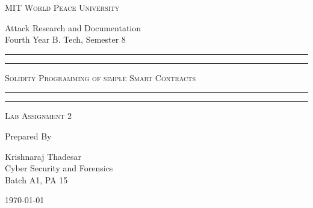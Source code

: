 \documentclass[11pt]{article}
\begin{document}
\begin{titlepage}
	\centering


	\huge\textsc{
		MIT World Peace University
	}\\

	\vspace{0.75\baselineskip} %

	\LARGE{
		Attack Research and Documentation\\
		Fourth Year B. Tech, Semester 8
	}

	\vfill %


	\rule{\textwidth}{1.6pt}\vspace*{-\baselineskip}\vspace*{2pt}
	\rule{\textwidth}{0.6pt}
	\vspace{0.75\baselineskip} %

	\huge{\textsc{
        Solidity Programming of simple Smart Contracts
    }} \\

	\vspace{0.5\baselineskip} %
	\rule{\textwidth}{0.6pt}\vspace*{-\baselineskip}\vspace*{2.8pt}
	\rule{\textwidth}{1.6pt}

	\vspace{1\baselineskip} %


	\LARGE\textsc{
		Lab Assignment 2
	} %
	\vfill


	Prepared By \vspace{0.5\baselineskip} %

	\Large{
		Krishnaraj Thadesar \\
		Cyber Security and Forensics\\
        Batch A1, PA 15
	}

	\vspace{0.5\baselineskip} %
	\today

\end{titlepage}
\end{document}

